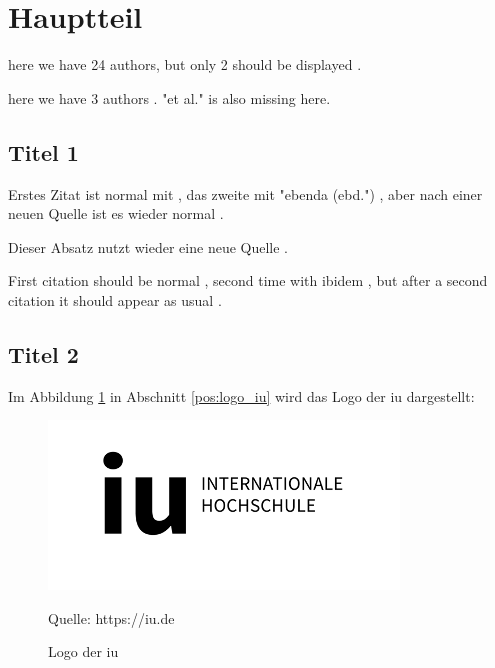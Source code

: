 \section{Hauptteil}

here we have 24 authors, but only 2 should be displayed \parencite{kniffinCOVID19WorkplaceImplications2021c}.

here we have 3 authors \parencite[5]{frondhoffFluchOderSegen2020}. "et al." is also missing here.

\subsection{Titel 1}

Erstes Zitat ist normal mit \parencite[12]{sigfridsson}, das zweite mit "ebenda (ebd.") 
\parencite[78-79]{sigfridsson}, aber nach einer neuen Quelle \parencite[30]{geer} ist es wieder normal \parencite[20]{sigfridsson}.

Dieser Absatz nutzt wieder eine neue Quelle \parencite{nussbaum}.

First citation should be normal \parencite[11]{sigfridsson}, second time with ibidem
\parencite[95]{sigfridsson}, but after a second citation \parencite[282]{geer} it should appear as usual \parencite[2]{sigfridsson}.

\subsection{Titel 2}

Im Abbildung \ref*{fig:logo_iu} in Abschnitt \ref*{pos:logo_iu} wird das Logo der \ac{iu} dargestellt:

\begin{figure}[ht!]
    \label{pos:logo_iu}
    \includegraphics[scale=0.35]{logos/IU.png}
    \caption[Logo der \acs{iu}]{Logo der \ac{iu}}{Quelle: https://iu.de}
    \label{fig:logo_iu}
\end{figure}


\lipsum[7-8]